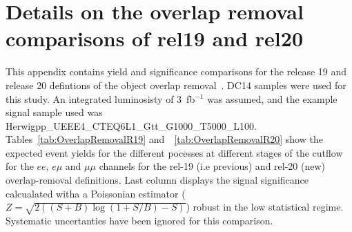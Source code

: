 \clearpage 
\section{Details on the overlap removal comparisons of rel19 and rel20}
\label{app_overlapremoval}

This appendix contains yield and significance comparisons for the release 19 and release 20 defintions of the object overlap removal~\cite{Harmonization}. DC14 samples were used for this study.
An integrated luminosisty of 3~fb$^{-1}$ was assumed, and the example signal sample used was Herwigpp\_UEEE4\_CTEQ6L1\_Gtt\_G1000\_T5000\_L100.
Tables~\ref{tab:OverlapRemovalR19} and~~\ref{tab:OverlapRemovalR20} show the expected event yields for the different pocesses at different stages of the cutflow for the $ee$, $e\mu$ and $\mu\mu$ channels for the rel-19 (i.e previous) and rel-20 (new) overlap-removal definitions.
Last column displays the signal significance calcualated witha a Poissonian estimator ($Z=\sqrt{2((S+B)\log(1+S/B)-S)}$) robust in the low statistical regime. Systematic uncertanties have been ignored for this comparison.

